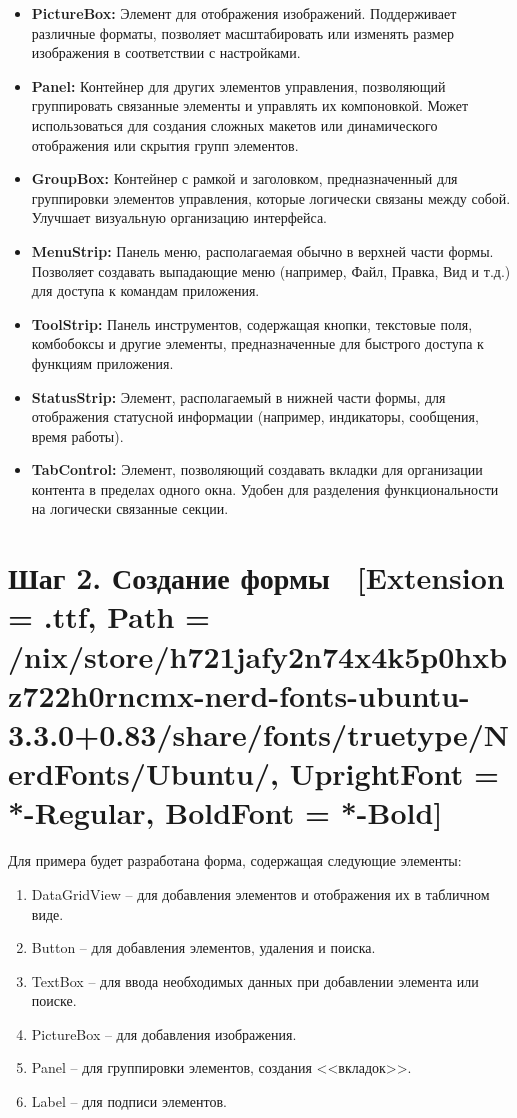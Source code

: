 \documentclass[12pt]{article}
\newcommand{\icon}[1]{\fontspec{UbuntuNerdFont}[Extension = .ttf,
  Path = /nix/store/h721jafy2n74x4k5p0hxbz722h0rncmx-nerd-fonts-ubuntu-3.3.0+0.83/share/fonts/truetype/NerdFonts/Ubuntu/,
  UprightFont = *-Regular,
BoldFont = *-Bold] #1}
\newcommand{\iicon}[1]{{\icon{#1}}}
\renewcommand{\texttt}[1]{{\small\ttfamily #1}}
\numberwithin{listing}{section}
\numberwithin{figure}{section}
\begin{document}
\begin{itemize}
	      Табличное представление данных с поддержкой привязки данных, сортировки, фильтрации и встроенного редактирования ячеек.
	\item \textbf{\texttt{PictureBox:}}
	      Элемент для отображения изображений. Поддерживает различные форматы, позволяет масштабировать или изменять размер изображения в соответствии с настройками.
	\item \textbf{\texttt{Panel:}}
	      Контейнер для других элементов управления, позволяющий группировать связанные элементы и управлять их компоновкой. Может использоваться для создания сложных макетов или динамического отображения или скрытия групп элементов.
	\item \textbf{\texttt{GroupBox:}}
	      Контейнер с рамкой и заголовком, предназначенный для группировки элементов управления, которые логически связаны между собой. Улучшает визуальную организацию интерфейса.
	\item \textbf{\texttt{MenuStrip:}}
	      Панель меню, располагаемая обычно в верхней части формы. Позволяет создавать выпадающие меню (например, Файл, Правка, Вид и т.д.) для доступа к командам приложения.
	\item \textbf{\texttt{ToolStrip:}}
	      Панель инструментов, содержащая кнопки, текстовые поля, комбобоксы и другие элементы, предназначенные для быстрого доступа к функциям приложения.
	\item \textbf{\texttt{StatusStrip:}}
	      Элемент, располагаемый в нижней части формы, для отображения статусной информации (например, индикаторы, сообщения, время работы).
	\item \textbf{\texttt{TabControl:}}
	      Элемент, позволяющий создавать вкладки для организации контента в пределах одного окна. Удобен для разделения функциональности на логически связанные секции.
\end{itemize}

\newpage

\section{Шаг 2. Создание формы \ \texorpdfstring{{\small{\iicon{}}}}{}}
Для примера будет разработана форма, содержащая следующие элементы:
\begin{enumerate}
	\item \texttt{DataGridView} -- для добавления элементов и отображения их в табличном виде.
	\item \texttt{Button} -- для добавления элементов, удаления и поиска.
	\item \texttt{TextBox} -- для ввода необходимых данных при добавлении элемента или поиске.
	\item \texttt{PictureBox} -- для добавления изображения.
	\item \texttt{Panel} -- для группировки элементов, создания <<вкладок>>.
	\item \texttt{Label} -- для подписи элементов.
\end{enumerate}
\end{document}
